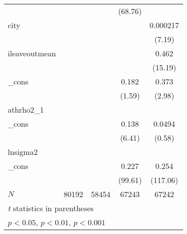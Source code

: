 {\begin{tabular}{l*{4}{c}}
            &                     &                     &     (68.76)         &                     \\
[1em]
city        &                     &                     &                     &    0.000217\sym{***}\\
            &                     &                     &                     &      (7.19)         \\
[1em]
ileaveoutmean&                     &                     &                     &       0.462\sym{***}\\
            &                     &                     &                     &     (15.19)         \\
[1em]
\_cons      &                     &                     &       0.182         &       0.373\sym{**} \\
            &                     &                     &      (1.59)         &      (2.98)         \\
\hline
athrho2\_1   &                     &                     &                     &                     \\
\_cons      &                     &                     &       0.138\sym{***}&      0.0494         \\
            &                     &                     &      (6.41)         &      (0.58)         \\
\hline
lnsigma2    &                     &                     &                     &                     \\
\_cons      &                     &                     &       0.227\sym{***}&       0.254\sym{***}\\
            &                     &                     &     (99.61)         &    (117.06)         \\
\hline
\(N\)       &       80192         &       58454         &       67243         &       67242         \\
\hline\hline
\multicolumn{5}{l}{\footnotesize \textit{t} statistics in parentheses}\\
\multicolumn{5}{l}{\footnotesize \sym{*} \(p<0.05\), \sym{**} \(p<0.01\), \sym{***} \(p<0.001\)}\\
\end{tabular}
}
